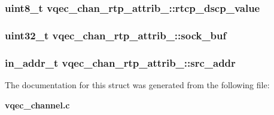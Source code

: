 \subsubsection{\setlength{\rightskip}{0pt plus 5cm}uint8\_\-t \bf{vqec\_\-chan\_\-rtp\_\-attrib\_\-::rtcp\_\-dscp\_\-value}}\label{structvqec__chan__rtp__attrib___0a13431924dfa06cc4eaaf055a67f082}


\subsubsection{\setlength{\rightskip}{0pt plus 5cm}uint32\_\-t \bf{vqec\_\-chan\_\-rtp\_\-attrib\_\-::sock\_\-buf}}\label{structvqec__chan__rtp__attrib___197acb50baf3e8508e64143e9d2aaeb5}


\subsubsection{\setlength{\rightskip}{0pt plus 5cm}in\_\-addr\_\-t \bf{vqec\_\-chan\_\-rtp\_\-attrib\_\-::src\_\-addr}}\label{structvqec__chan__rtp__attrib___f1cbfea902b0eb50126834c2faf1ab42}




The documentation for this struct was generated from the following file:\begin{CompactItemize}
\item 
\bf{vqec\_\-channel.c}\end{CompactItemize}
